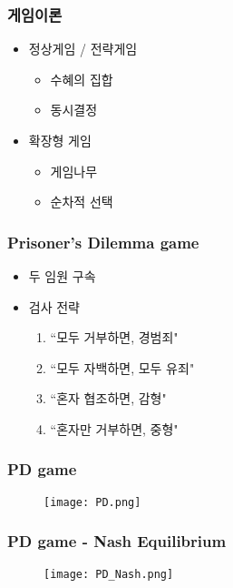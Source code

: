 \documentclass[xcolor=pdftex,dvipsnames]{beamer}
\begin{document}
\begin{frame}
\frametitle{게임이론}
\begin{itemize}
\item 정상게임 / 전략게임
\begin{itemize}
\item 수혜의 집합
\item 동시결정
\end{itemize}
\item 확장형 게임 
\begin{itemize}
\item 게임나무
\item 순차적 선택
\end{itemize}
\end{itemize}
\end{frame}

\begin{frame}
\frametitle{Prisoner's Dilemma game}
\begin{itemize}
\item 두 임원 구속
\item 검사 전략

\begin{enumerate}
\item ``모두 거부하면, 경범죄"
\item ``모두 자백하면, 모두 유죄"
\item ``혼자 협조하면, 감형"
\item ``혼자만 거부하면, 중형"
\end{enumerate}

\end{itemize}
\end{frame}

\begin{frame}
\frametitle{PD game}
\begin{figure}
\begin{center}
  \texttt{[image: PD.png]}\\
\end{center}
\end{figure}
\end{frame}

\begin{frame}
\frametitle{PD game - Nash Equilibrium}
\begin{figure}
\begin{center}
  \texttt{[image: PD\_Nash.png]}\\
\end{center}
\end{figure}
\end{frame}
\end{document}

